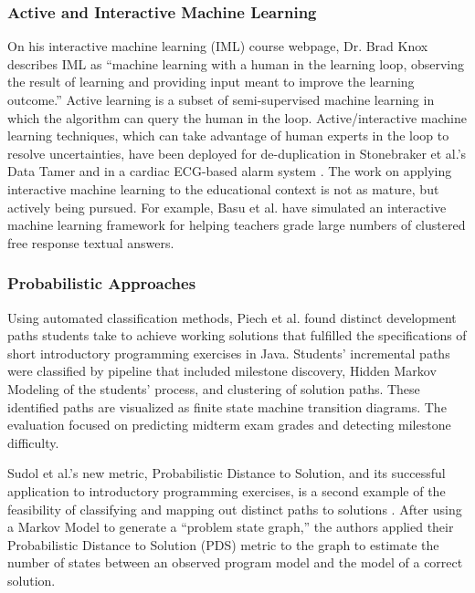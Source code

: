 \subsubsection{Active and Interactive Machine Learning}

On his interactive machine learning (IML) course webpage, Dr. Brad Knox describes IML as ``machine learning with a human in the learning loop, observing the result of learning and providing input meant to improve the learning outcome.'' Active learning is a subset of semi-supervised machine learning in which the algorithm can query the human in the loop. Active/interactive machine learning techniques, which can take advantage of human experts in the loop to resolve uncertainties, have been deployed for de-duplication in Stonebraker et al.'s Data Tamer \cite{stonebraker2013data} and in a cardiac ECG-based alarm system \cite{JWiensNIPS}. The work on applying interactive machine learning to the educational context is not as mature, but actively being pursued. For example, Basu et al. \cite{basupowergrading} have simulated an interactive machine learning framework for helping teachers grade large numbers of clustered free response textual answers.


\subsubsection{Probabilistic Approaches}

Using automated classification methods, Piech et al. \cite{Piech} found distinct development paths students take to achieve working solutions that fulfilled the specifications of short introductory programming exercises in Java. Students' incremental paths were classified by pipeline that included milestone discovery, Hidden Markov Modeling of the students' process, and clustering of solution paths. These identified paths are visualized as finite state machine transition diagrams. The evaluation focused on predicting midterm exam grades and detecting milestone difficulty. 

Sudol et al.'s new metric, Probabilistic Distance to Solution, and its successful application to introductory programming exercises, is a second example of the feasibility of classifying and mapping out distinct paths to solutions \cite{sudol12}. After using a Markov Model to generate a ``problem state graph,'' the authors applied their Probabilistic Distance to Solution (PDS) metric to the graph to estimate the number of states between an observed program model and the model of a correct solution.

